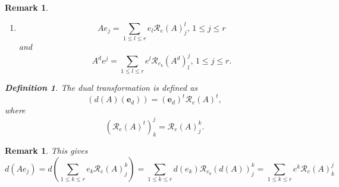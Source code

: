 \documentclass[aps,preprint]{revtex4}
\newtheorem{definition}[theorem]{Definition}
\newtheorem{remark}[theorem]{Remark}
\begin{document}
\begin{enumerate}
\begin{enumerate}
\begin{remark}
\begin{enumerate}
\item 
\begin{equation}
Ae_{j}=\sum_{1\leq l\leq r}e_{l}\mathcal{R}_{e}\left( A\right)
_{j}^{l},\,1\leq j\leq r
\end{equation}%
and%
\begin{equation}
A^{d}e^{j}=\sum_{1\leq l\leq r}e^{l}\mathcal{R}_{e_{b}}\left( A^{d}\right)
_{l}^{j},\,1\leq j\leq r.
\end{equation}
\end{enumerate}

\begin{definition}
The dual transformation is defined as 
\begin{equation}
\left( d\left( A\right) \left( \boldsymbol{e}_{d}\right) \right) =\left( 
\boldsymbol{e}_{d}\right) ^{t}\mathcal{R}_{e}\left( A\right) ^{t},
\end{equation}%
where 
\begin{equation}
\left( \mathcal{R}_{e}\left( A\right) ^{t}\right) _{k}^{j}=\mathcal{R}%
_{e}\left( A\right) _{j}^{k}.
\end{equation}
\end{definition}
\end{remark}

\begin{remark}
This gives 
\begin{equation}
d\left( Ae_{j}\right) =d\left( \sum_{1\leq k\leq r}e_{k}\mathcal{R}%
_{e}\left( A\right) _{j}^{k}\right) =\sum_{1\leq k\leq r}d\left(
e_{k}\right) \mathcal{R}_{e_{b}}\left( d\left( A\right) \right)
_{j}^{k}=\sum_{1\leq k\leq r}e^{k}\mathcal{R}_{e}\left( A\right) _{k}^{j}
\end{equation}
\end{remark}


\end{enumerate}
\end{enumerate}
\end{document}
